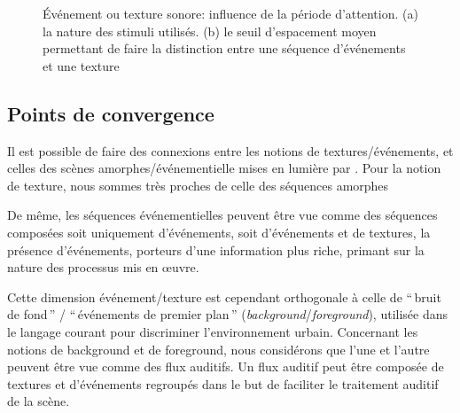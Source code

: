 \begin{figure}[bth]
        \myfloatalign
        \caption[Événement ou texture sonore: influence de la période d'attention]{Événement ou texture sonore: influence de la période d'attention. (a) la nature des stimuli utilisés. (b) le seuil d'espacement moyen permettant de faire la distinction entre une séquence d'événements et une texture}\label{fig:xptexture}
\end{figure}


\subsection{Points de convergence}


Il est possible de faire des connexions entre les notions de textures/événements, et celles des scènes amorphes/événementielle mises en lumière par \citep{maffiolo_caracterisation_1999}. Pour la notion de texture, nous sommes très proches de celle des séquences amorphes

De même, les séquences événementielles peuvent être vue comme des séquences composées soit uniquement d'événements, soit d'événements et de textures, la présence d'événements, porteurs d'une information plus riche, primant sur la nature des processus mis en œuvre. 

Cette dimension événement/texture est cependant orthogonale à celle de ``\,bruit de fond\,'' / ``\,événements de premier plan\,'' (\emph{background}/\emph{foreground}), utilisée dans le langage courant pour discriminer l’environnement urbain. Concernant les notions de background et de foreground, nous considérons que l'une et l'autre peuvent être vue comme des flux auditifs. Un flux auditif peut être composée de textures et d’événements regroupés dans le but de faciliter le traitement auditif de la scène. 


